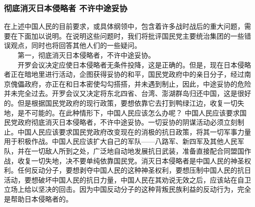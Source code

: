 \documentclass[cn,11pt,chinese]{elegantbook}
\def\myformat#1{\hfil\hfil #1}
\begin{document}
\subsubsection*{\myformat{彻底消灭日本侵略者 不许中途妥协}}
在上述中国人民的目前要求，或具体纲领中，包含着许多战时战后的重大问题，需要在下面加以说明。在说明这些问题时，我们将批评国民党主要统治集团的一些错误观点，同时也将回答其他人们的一些疑问。\\
　　第一，彻底消灭日本侵略者，不许中途妥协。\\
　　开罗会议决定应使日本侵略者无条件投降，这是正确的。但是，现在日本侵略者正在暗地里进行活动，企图获得妥协的和平，国民党政府中的亲日分子，经过南京傀儡政府，亦正在和日本密使勾勾搭搭，并未遇到制止，因此，中途妥协的危险并未完全过去。开罗会议又决定将东北四省、台湾、澎湖群岛归还中国，这是很好的。但是根据国民党政府的现行政策，要想依靠它去打到鸭绿江边，收复一切失地，是不可能的。在此种情形下，中国人民应该怎么办呢？ 中国人民应该要求国民党政府彻底消灭日本侵略者，不许中途妥协。一切妥协的阴谋活动必须立刻制止。中国人民应该要求国民党政府改变现在的消极的抗日政策，将其一切军事力量用于积极作战。中国人民应该扩大自己的军队——八路军、新四军及其他人民军队，并在一切敌人所到之处，广泛地自动地发展抗日武装，准备直接配合同盟国作战，收复一切失地，决不要单纯依靠国民党。消灭日本侵略者是中国人民的神圣权利。任何反动分子，要想剥夺中国人民的这种神圣权利，要想压制中国人民的抗日活动，要想破坏中国人民的抗日力量，中国人民在其劝说无效之后，应该站在自卫立场上给以坚决的回击。因为中国反动分子的这种背叛民族利益的反动行为，完全是帮助日本侵略者的。\\
\end{document}
